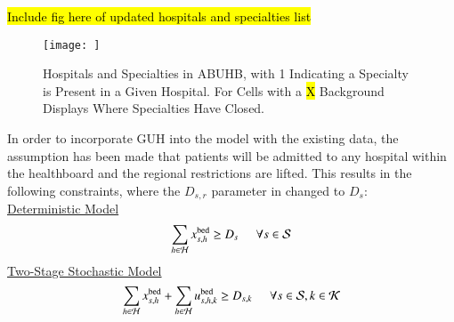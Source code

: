 \documentclass[../thesis.tex]{subfiles}
\begin{document}
\hl{Include fig here of updated hospitals and specialties list}
\begin{figure}
    \centering
    \texttt{[image: ]}
    \caption{Hospitals and Specialties in ABUHB, with 1 Indicating a Specialty is Present in a Given Hospital. For Cells with a \hl{X} Background Displays Where Specialties Have Closed.}
    \label{fig:relocation}
\end{figure}

In order to incorporate GUH into the model with the existing data, the assumption has been made that patients will be admitted to any hospital within the healthboard and the regional restrictions are lifted. This results in the following constraints, where the $D_{s,r}$ parameter in changed to $D_{s}$:\\
\underline{Deterministic Model}
\begin{equation}
    \sum_{h\in\mathcal{H}} x^\textnormal{bed}_{s,h}\geq D_{s}  \hspace{0.5cm} \forall  s \in \mathcal{S}
\end{equation}
\underline{Two-Stage Stochastic Model}
\begin{equation}
    \sum_{h\in\mathcal{H}} x^\textnormal{bed}_{s,h} +  \sum_{h\in\mathcal{H}} u^\textnormal{bed}_{s,h,k} \geq D_{s,k} \hspace{0.5cm} \forall s \in \mathcal{S}, k \in \mathcal{K}\\
\end{equation}

\end{document}
